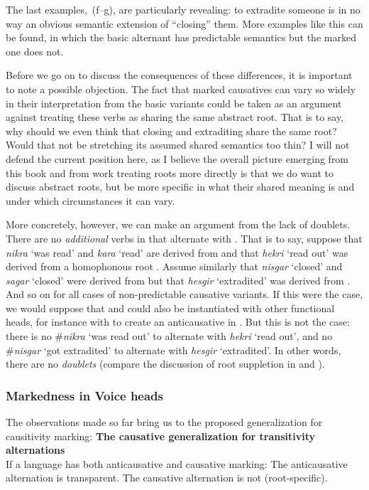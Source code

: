 The last examples,~(\lastx f--g), are particularly revealing: to extradite someone is in no way an obvious semantic extension of ``closing'' them. More examples like this can be found, in which the basic alternant has predictable semantics but the marked one does not.

Before we go on to discuss the consequences of these differences, it is important to note a possible objection. The fact that marked causatives can vary so widely in their interpretation from the basic variants could be taken as an argument against treating these verbs as sharing the same abstract root. That is to say, why should we even think that closing and extraditing share the same root? Would that not be stretching its assumed shared semantics too thin? I will not defend the current position here, as I believe the overall picture emerging from this book and from work treating roots more directly is that we do want to discuss abstract roots, but be more specific in what their shared meaning is and under which circumstances it can vary.

More concretely, however, we can make an argument from the lack of doublets. There are no \emph{additional} verbs in {\tnif} that alternate with {\thif}. That is to say, suppose that \emph{nikra} `was read' and \emph{kara} `read' are derived from  and that \emph{hekri} `read out' was derived from a homophonous root . Assume similarly that \emph{nisgar} `closed' and \emph{sagar} `closed' were derived from  but that \emph{hesgir} `extradited' was derived from . And so on for all cases of non-predictable causative variants. If this were the case, we would suppose that  and  could also be instantiated with other functional heads, for instance with {\vz} to create an anticausative in {\tnif}. But this is not the case: there is no \#\emph{nikra} `was read out' to alternate with \emph{hekri} `read out', and no \#\emph{nisgar} `got extradited' to alternate with \emph{hesgir} `extradited'. In other words, there are no \emph{doublets} (compare the discussion of root suppletion in \citealt{harley14thlia,harley14thlib,harley15roots} and \citealt{borer14thli}).

		\subsubsection{Markedness in Voice heads}
The observations made so far bring us to the proposed generalization for causitivity marking:
\pex \textbf{The causative generalization for transitivity alternations}\\
	If a language has both anticausative and causative marking:
	\a The anticausative alternation is transparent.
	\a The causative alternation is not (root-specific).
\xe

